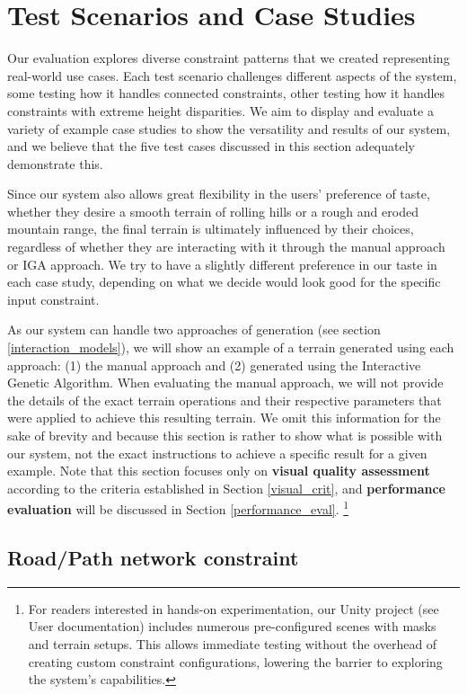 \section{Test Scenarios and Case Studies}
\label{case_studies}

Our evaluation explores diverse constraint patterns that we created representing real-world use cases. Each test scenario challenges different aspects of the system, some testing how it handles connected constraints, other testing how it handles constraints with extreme height disparities. We aim to display and evaluate a variety of example case studies to show the versatility and results of our system, and we believe that the five test cases discussed in this section adequately demonstrate this. 

Since our system also allows great flexibility in the users' preference of taste, whether they desire a smooth terrain of rolling hills or a rough and eroded mountain range, the final terrain is ultimately influenced by their choices, regardless of whether they are interacting with it through the manual approach or IGA approach. We try to have a slightly different preference in our taste in each case study, depending on what we decide would look good for the specific input constraint. 

As our system can handle two approaches of generation (see section \ref{interaction_models}), we will show an example of a terrain generated using each approach: (1) the manual approach and (2) generated using the Interactive Genetic Algorithm. When evaluating the manual approach, we will not provide the details of the exact terrain operations and their respective parameters that were applied to achieve this resulting terrain. We omit this information for the sake of brevity and because this section is rather to show what is possible with our system, not the exact instructions to achieve a specific result for a given example. Note that this section focuses only on \textbf{visual quality assessment} according to the criteria established in Section \ref{visual_crit}, and \textbf{performance evaluation} will be discussed in Section \ref{performance_eval}. \footnote{For readers interested in hands-on experimentation, our Unity project (see User documentation) includes numerous pre-configured scenes with masks and terrain setups.  This allows immediate testing without the overhead of creating custom constraint configurations, lowering the barrier to exploring the system's capabilities.}

\subsection{Road/Path network constraint}

